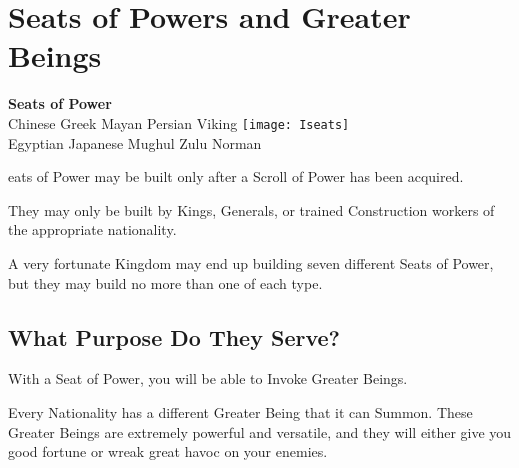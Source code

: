 
\chapter{Seats of Powers and Greater Beings}


\begin{center}
    \textbf{Seats of Power}
    \\ Chinese Greek Mayan Persian Viking
    \texttt{[image: Iseats]} %
    \\ Egyptian Japanese Mughul Zulu Norman
\end{center}

eats of Power may be built only after a Scroll of Power has been acquired.

They may only be built by Kings, Generals, or trained Construction workers of the appropriate nationality.

A very fortunate Kingdom may end up building seven different Seats of Power, but they may build no more than one of each type.

\clearpage

\section{What Purpose Do They Serve?}

With a Seat of Power, you will be able to Invoke Greater Beings.

Every Nationality has a different Greater Being that it can Summon. These Greater Beings are extremely powerful and versatile, and they will either give you good fortune or wreak great havoc on your enemies.

